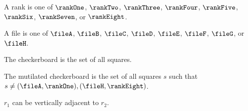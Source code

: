 

%
%
\begin{inductive}
   A rank is one of
   $\rankOne$, $\rankTwo$, $\rankThree$, $\rankFour$, $\rankFive$, $\rankSix$, $\rankSeven$, or $\rankEight$.
\end{inductive}



%
\begin{inductive}
   A file is one of
   $\fileA$, $\fileB$, $\fileC$, $\fileD$, $\fileE$, $\fileF$, $\fileG$, or $\fileH$.
\end{inductive}






\begin{definition}
   The checkerboard is the set of all squares.
\end{definition}





\begin{definition}
   The mutilated checkerboard is the set of all squares $s$
   such that $s \neq (\fileA, \rankOne), (\fileH, \rankEight)$.
\end{definition}





\begin{signature}
   $r_1$ can be vertically adjacent to $r_2$.
\end{signature}


